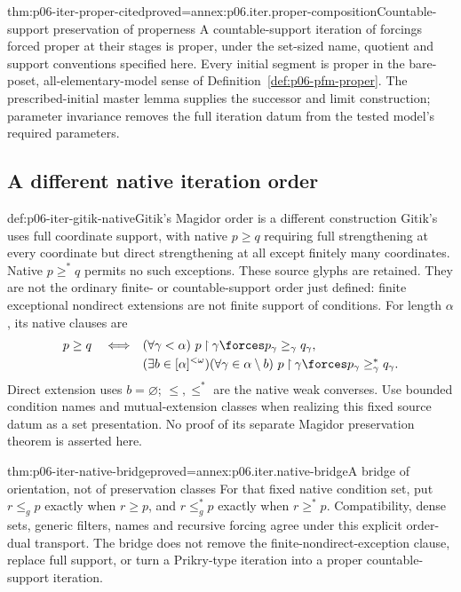 \begin{hbtheorem}{thm:p06-iter-proper-cited}{proved=annex:p06.iter.proper-composition}{Countable-support preservation of properness}
A countable-support iteration of forcings forced proper at their stages
is proper, under the set-sized name, quotient and support conventions
specified here. Every initial segment is proper in the bare-poset,
all-elementary-model sense of Definition~\ref{def:p06-pfm-proper}.
The prescribed-initial master lemma supplies the successor and limit
construction; parameter invariance removes the full iteration datum from
the tested model's required parameters.
\end{hbtheorem}

\subsection{A different native iteration order}

\begin{hbdefinition}{def:p06-iter-gitik-native}{Gitik's Magidor order is a different construction}
Gitik's \cite[\S6.1, Definition~6.1]{GitikPrikryAuthorDraft} uses full
coordinate support, with native \(p\geq q\) requiring full strengthening
at every coordinate but direct strengthening at all except finitely many
coordinates. Native \(p\geq^*q\) permits no such exceptions.
These source glyphs are retained. They are not the ordinary finite- or
countable-support order just defined: finite exceptional nondirect
extensions are not finite support of conditions.
For length \(\alpha\), its native clauses are
\[
\begin{aligned}
 p\geq q\quad\Longleftrightarrow\quad&
 (\forall\gamma<\alpha)\ p\mathbin{\upharpoonright}\gamma
       \forces p_\gamma\geq_\gamma q_\gamma,\\
 & (\exists b\in[\alpha]^{<\omega})(\forall\gamma\in\alpha\setminus b)\
 p\mathbin{\upharpoonright}\gamma\forces
                 p_\gamma\geq^*_\gamma q_\gamma.
\end{aligned}
\]
Direct extension uses \(b=\varnothing\); \(\leq,\leq^*\) are the
native weak converses. Use bounded condition names and mutual-extension
classes when realizing this fixed source datum as a set presentation.
No proof of its separate Magidor preservation theorem is asserted here.
\end{hbdefinition}

\begin{hblemma}{thm:p06-iter-native-bridge}{proved=annex:p06.iter.native-bridge}{A bridge of orientation, not of preservation classes}
For that fixed native condition set, put \(r\leq_g p\) exactly when
\(r\geq p\), and \(r\leq_g^*p\) exactly when \(r\geq^*p\).
Compatibility, dense sets, generic filters, names and recursive forcing
agree under this explicit order-dual transport. The bridge does not
remove the finite-nondirect-exception clause, replace full support, or
turn a Prikry-type iteration into a proper countable-support iteration.
\end{hblemma}

